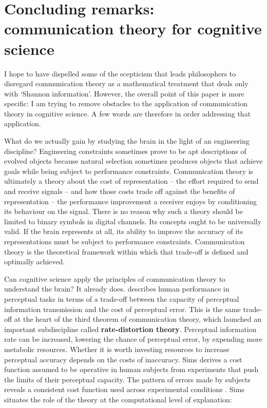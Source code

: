 \section{Concluding remarks: communication theory for cognitive science}\label{sec:conclusion}

I hope to have dispelled some of the scepticism that leads philosophers to disregard communication theory as a mathematical treatment that deals only with `Shannon information'.
However, the overall point of this paper is more specific: I am trying to remove obstacles to the application of communication theory in cognitive science.
A few words are therefore in order addressing that application.

What do we actually gain by studying the brain in the light of an engineering discipline?
Engineering constraints sometimes prove to be apt descriptions of evolved objects because natural selection sometimes produces objects that achieve goals while being subject to performance constraints.
Communication theory is ultimately a theory about the cost of representation -- the effort required to send and receive signals -- and how those costs trade off against the benefits of representation -- the performance improvement a receiver enjoys by conditioning its behaviour on the signal.
There is no reason why such a theory should be limited to binary symbols in digital channels.
Its concepts ought to be universally valid.
If the brain represents at all, its ability to improve the accuracy of its representations must be subject to performance constraints.
Communication theory is the theoretical framework within which that trade-off is defined and optimally achieved.

Can cognitive science apply the principles of communication theory to understand the brain?
It already does.
\citet{sims2016ratedistortion} describes human performance in perceptual tasks in terms of a trade-off between the capacity of perceptual information transmission and the cost of perceptual error.
This is the same trade-off at the heart of the third theorem of communication theory, which launched an important subdiscipline called \textbf{rate-distortion theory}.
Perceptual information rate can be increased, lowering the chance of perceptual error, by expending more metabolic resources.
Whether it is worth investing resources to increase perceptual accuracy depends on the costs of inaccuracy.
Sims derives a cost function assumed to be operative in human subjects from experiments that push the limits of their perceptual capacity.
The pattern of errors made by subjects reveals a consistent cost function used across experimental conditions \citep[188]{sims2016ratedistortion}.
Sims situates the role of the theory at the computational level of explanation:

